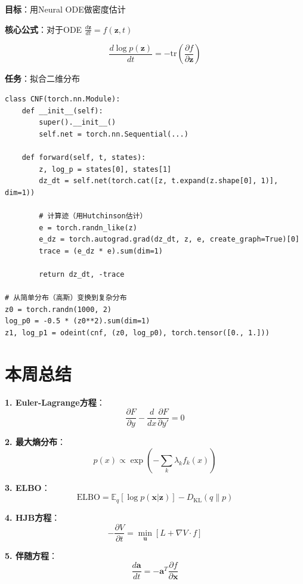 \documentclass[12pt, a4paper]{ctexart}
\begin{document}
\begin{experiment}

\textbf{目标}：用Neural ODE做密度估计

\textbf{核心公式}：对于ODE $\frac{d\mathbf{z}}{dt} = f(\mathbf{z}, t)$

\[
\frac{d \log p(\mathbf{z})}{dt} = -\text{tr}\left( \frac{\partial f}{\partial \mathbf{z}} \right)
\]

\textbf{任务}：拟合二维分布

\begin{lstlisting}
class CNF(torch.nn.Module):
    def __init__(self):
        super().__init__()
        self.net = torch.nn.Sequential(...)
    
    def forward(self, t, states):
        z, log_p = states[0], states[1]
        dz_dt = self.net(torch.cat([z, t.expand(z.shape[0], 1)], dim=1))
        
        # 计算迹（用Hutchinson估计）
        e = torch.randn_like(z)
        e_dz = torch.autograd.grad(dz_dt, z, e, create_graph=True)[0]
        trace = (e_dz * e).sum(dim=1)
        
        return dz_dt, -trace

# 从简单分布（高斯）变换到复杂分布
z0 = torch.randn(1000, 2)
log_p0 = -0.5 * (z0**2).sum(dim=1)
z1, log_p1 = odeint(cnf, (z0, log_p0), torch.tensor([0., 1.]))
\end{lstlisting}

\end{experiment}

\section{本周总结}

\begin{keypoint}[核心公式]

\textbf{1. Euler-Lagrange方程}：
\[
\frac{\partial F}{\partial y} - \frac{d}{dx}\frac{\partial F}{\partial y'} = 0
\]

\textbf{2. 最大熵分布}：
\[
p(x) \propto \exp\left( -\sum_k \lambda_k f_k(x) \right)
\]

\textbf{3. ELBO}：
\[
\text{ELBO} = \mathbb{E}_q[\log p(\mathbf{x}|\mathbf{z})] - D_{\text{KL}}(q \| p)
\]

\textbf{4. HJB方程}：
\[
-\frac{\partial V}{\partial t} = \min_{\mathbf{u}} \left[ L + \nabla V \cdot f \right]
\]

\textbf{5. 伴随方程}：
\[
\frac{d\mathbf{a}}{dt} = -\mathbf{a}^T \frac{\partial f}{\partial \mathbf{x}}
\]

\end{keypoint}
\end{document}
